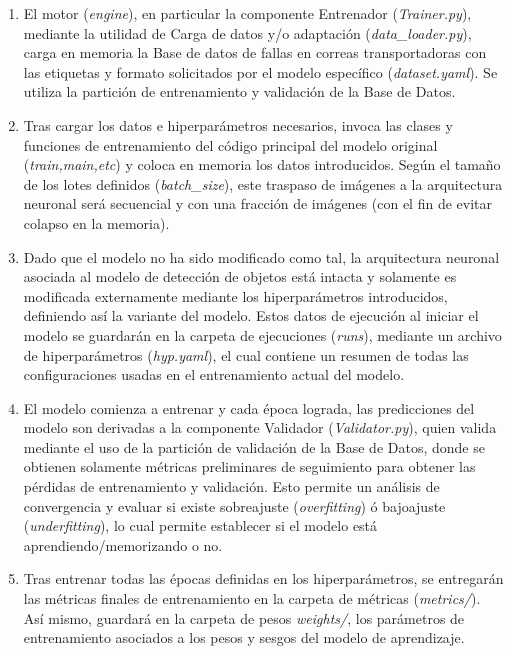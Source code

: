 \begin{enumerate}
\begin{enumerate}
        \item El motor (\textit{engine}), en particular la componente Entrenador (\textit{Trainer.py}), mediante la utilidad de Carga de datos y/o adaptación (\textit{data\_loader.py}), carga en memoria la Base de datos de fallas en correas transportadoras con las etiquetas y formato solicitados por el modelo específico (\textit{dataset.yaml}). Se utiliza la partición de entrenamiento y validación de la Base de Datos.
        \item Tras cargar los datos e hiperparámetros necesarios, invoca las clases y funciones de entrenamiento del código principal del modelo original (\textit{train,main,etc}) y coloca en memoria los datos introducidos. Según el tamaño de los lotes definidos (\textit{batch\_size}), este traspaso de imágenes a la arquitectura neuronal será secuencial y con una fracción de imágenes (con el fin de evitar colapso en la memoria).
        \item Dado que el modelo no ha sido modificado como tal, la arquitectura neuronal asociada al modelo de detección de objetos está intacta y solamente es modificada externamente mediante los hiperparámetros introducidos, definiendo así la variante del modelo. Estos datos de ejecución al iniciar el modelo se guardarán en la carpeta de ejecuciones (\textit{runs}), mediante un archivo de hiperparámetros (\textit{hyp.yaml}), el cual contiene un resumen de todas las configuraciones usadas en el entrenamiento actual del modelo.
        \item El modelo comienza a entrenar y cada época lograda, las predicciones del modelo son derivadas a la componente Validador (\textit{Validator.py}), quien valida mediante el uso de la partición de validación de la Base de Datos, donde se obtienen solamente métricas preliminares de seguimiento para obtener las pérdidas de entrenamiento y validación. Esto permite un análisis de convergencia y evaluar si existe sobreajuste (\textit{overfitting}) ó bajoajuste (\textit{underfitting}), lo cual permite establecer si el modelo está aprendiendo/memorizando o no.
        \item Tras entrenar todas las épocas definidas en los hiperparámetros, se entregarán las métricas finales de entrenamiento en la carpeta de métricas (\textit{metrics/}). Así mismo, guardará en la carpeta de pesos \textit{weights/}, los parámetros de entrenamiento asociados a los pesos y sesgos del modelo de aprendizaje.
    \end{enumerate}


\end{enumerate}
